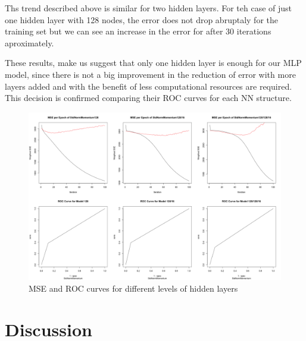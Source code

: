 \documentclass[11.5pt]{article}
\newcounter{graphics}
\begin{document}
Ths trend described above is similar for two hidden layers. For teh case of just one hidden layer with 128 nodes, the error does not drop abruptaly for the training set but we can see an increase in the error for after 30 iterations aproximately. \par 

These results, make us suggest that only one hidden layer is enough for our MLP model, since there is not a big improvement in the reduction of error with more layers added and with the benefit of less computational resources are required.
This decision is confirmed comparing their ROC curves for each NN structure.
 








\begin{figure}[h!]
  \includegraphics[width=1\textwidth]{report_mlp/different_layers_MSE_ROC.png}
    \caption{MSE and ROC curves for different levels of hidden layers}
    \label{different_layers_MSE_ROC.png}
\end{figure}



\section{Discussion}


{}
\end{document}
